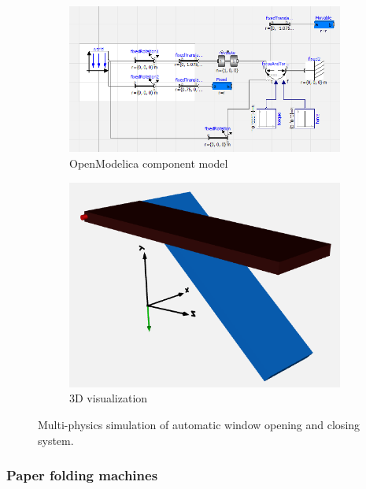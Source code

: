 \documentclass{PDS}
\begin{document}
\begin{figure}[htbp]
    \begin{subfigure}[b]{0.575\textwidth}
        \includegraphics[width=\textwidth]{./figures/glasshouse_mechatronic_1.png}
        \caption{OpenModelica component model}
        \label{fig:glasshouse-sim-1}
    \end{subfigure}
    \hfill
    \begin{subfigure}[b]{0.41\textwidth}
        \includegraphics[width=\textwidth]{./figures/glasshouse_mechatronic_2.png}
        \caption{3D visualization}
        \label{fig:glasshouse-sim-2}
    \end{subfigure}
    \caption{Multi-physics simulation of automatic window opening and closing system.}
    \label{fig:glasshouse-sim}
\end{figure}


\subsubsection{Paper folding machines}
\label{sec:master-system-lego}
\end{document}
